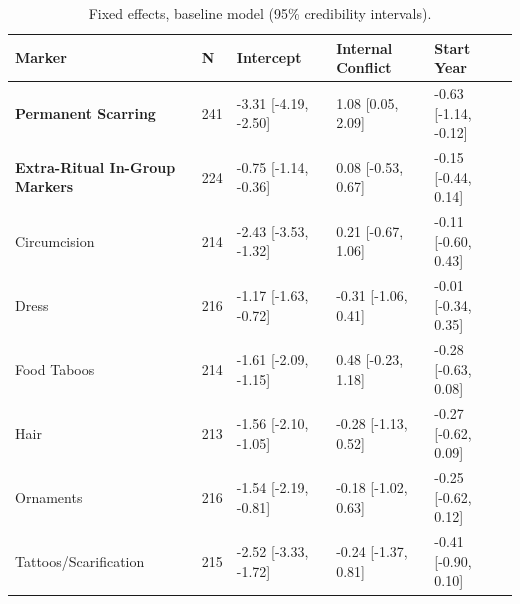 \begin{table}[!ht]
\centering
\small
\caption{Fixed effects, baseline model (95\% credibility intervals).}
\label{tab:int_fixed_effects_baseline}
\begin{tabular}{p{4cm}llll}
\toprule
Marker & N & Intercept & Internal Conflict & Start Year \\
\midrule
\textbf{Permanent Scarring} & 241 & -3.31 [-4.19, -2.50] & 1.08 [0.05, 2.09] & -0.63 [-1.14, -0.12] \\
\textbf{Extra-Ritual In-Group Markers} & 224 & -0.75 [-1.14, -0.36] & 0.08 [-0.53, 0.67] & -0.15 [-0.44, 0.14] \\
\midrule
Circumcision & 214 & -2.43 [-3.53, -1.32] & 0.21 [-0.67, 1.06] & -0.11 [-0.60, 0.43] \\
Dress & 216 & -1.17 [-1.63, -0.72] & -0.31 [-1.06, 0.41] & -0.01 [-0.34, 0.35] \\
Food Taboos & 214 & -1.61 [-2.09, -1.15] & 0.48 [-0.23, 1.18] & -0.28 [-0.63, 0.08] \\
Hair & 213 & -1.56 [-2.10, -1.05] & -0.28 [-1.13, 0.52] & -0.27 [-0.62, 0.09] \\
Ornaments & 216 & -1.54 [-2.19, -0.81] & -0.18 [-1.02, 0.63] & -0.25 [-0.62, 0.12] \\
Tattoos/Scarification & 215 & -2.52 [-3.33, -1.72] & -0.24 [-1.37, 0.81] & -0.41 [-0.90, 0.10] \\
\bottomrule
\end{tabular}
\end{table}